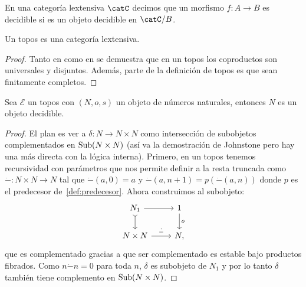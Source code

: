 \begin{definition}
  En una categoría lextensiva $\catC$ decimos que un morfismo $f\colon A\to B$ es 
  decidible si es un objeto decidible en $\catC/B$.
\end{definition}

\begin{proposition}
  Un topos es una categoría lextensiva.
\end{proposition}
\begin{proof}
  Tanto en \cite{johnstone2002sketches} como en \cite{maclane2012sheaves} se demuestra que
  en un topos los coproductos son universales y disjuntos. Además, parte de la definición de topos
  es que sean finitamente completos.
\end{proof}

\begin{theorem}[label=thm:onndecidible]
  Sea $\mathcal{E}$ un topos con $(N,o,s)$ un objeto de números naturales, entonces $N$ es un objeto decidible.
\end{theorem}
\begin{proof}
  El plan es ver a $\delta\colon N\to N\times N$ como intersección de subobjetos complementados en $\operatorname{Sub}(N\times N)$ (así va la demostración de Johnstone pero hay una más directa con la lógica interna).
  Primero, en un topos tenemos recursividad con parámetros que nos permite definir a la resta truncada como 
  $\dot{-}\colon N\times N\to N$ tal que $\dot{-}(a,0)=a$ y $\dot{-}(a,n+1)=p(\dot{-}(a,n))$ donde $p$ es el predecesor de~\ref{def:predecesor}.
  Ahora construimos al subobjeto:
  \begin{equation*}
    \begin{tikzcd}
      N_1\ar{r}{}\ar[tail]{d}{} & 1\ar{d}{o} \\
      N\times N\ar{r}{\dot{-}} & N,
    \end{tikzcd}
  \end{equation*}
  que es complementado gracias a que ser complementado es estable bajo productos fibrados. Como $n\dot{-}n=0$ para toda $n$,
  $\delta$ es subobjeto de $N_1$ y por lo tanto $\delta$ también tiene complemento en $\operatorname{Sub}(N\times N)$.
\end{proof}

